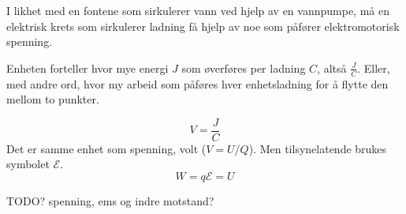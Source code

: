 I likhet med en fontene som sirkulerer vann ved hjelp av en vannpumpe,
må en elektrisk krets som sirkulerer ladning få hjelp av noe som påfører
elektromotorisk spenning.

Enheten forteller hvor mye energi $J$ som øverføres per ladning $C$,
altså $\frac{J}{C}$.
Eller, med andre ord, hvor my arbeid som påføres hver enhetsladning
for å flytte den mellom to punkter.

$$V = \frac{J}{C}$$
Det er samme enhet som spenning, volt ($V = U/Q$).
Men tilsynelatende brukes symbolet $\mathcal{E}$.
$$W = q\mathcal{E} = U$$



TODO? spenning, ems og indre motstand?
